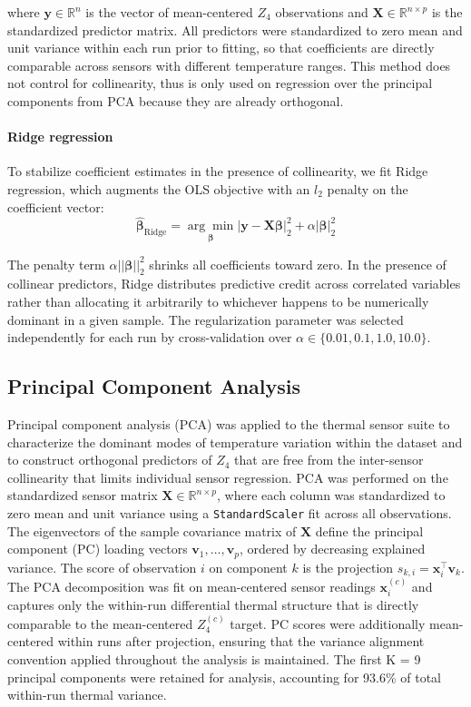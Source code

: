 \documentclass[SE,authoryear,toc]{lsstdoc}
\begin{document}
where $\mathbf{y} \in \mathbb{R}^n$ is the vector of mean-centered $Z_4$ observations and $\mathbf{X} \in \mathbb{R}^{n \times p}$ is the standardized predictor matrix. All predictors were standardized to zero mean and unit variance within each run prior to fitting, so that coefficients are directly comparable across sensors with different temperature ranges. This method does not control for collinearity, thus is only used on regression over the principal components from PCA because they are already orthogonal.


\paragraph{Ridge regression}
To stabilize coefficient estimates in the presence of collinearity, we fit Ridge regression, which augments the OLS objective with an $l_2$ penalty on the coefficient vector:
\begin{equation}
\hat{\boldsymbol{\beta}}_\text{Ridge} = \underset{\boldsymbol{\beta}}{\arg\min} \left| \mathbf{y} - \mathbf{X}\boldsymbol{\beta} \right|_2^2 + \alpha \left| \boldsymbol{\beta} \right|_2^2
\end{equation}

The penalty term $\alpha ||\boldsymbol{\beta}||^2_2$ shrinks all coefficients toward zero. In the presence of collinear predictors, Ridge distributes predictive credit across correlated variables rather than allocating it arbitrarily to whichever happens to be numerically dominant in a given sample. The regularization parameter was selected independently for each run by cross-validation over $\alpha \in \{0.01, 0.1, 1.0, 10.0\}$.

\subsection{Principal Component Analysis}
\label{subsec: PCA}

Principal component analysis (PCA) was applied to the thermal sensor suite to characterize the dominant modes of temperature variation within the dataset and to construct orthogonal predictors of $Z_4$ that are free from the inter-sensor collinearity that limits individual sensor regression.
PCA was performed on the standardized sensor matrix $\mathbf{X} \in \mathbb{R}^{n \times p}$, where each column was standardized to zero mean and unit variance using a \texttt{StandardScaler} fit across all observations. The eigenvectors of the sample covariance matrix of $\mathbf{X}$ define the principal component (PC) loading vectors $\mathbf{v}_1, \ldots, \mathbf{v}_p$, ordered by decreasing explained variance. The score of observation $i$ on component $k$ is the projection $s_{k,i} = \mathbf{x}_i^\top \mathbf{v}_k$.
The PCA decomposition was fit on mean-centered sensor readings $\mathbf{x}_i^{(c)}$ and captures only the within-run differential thermal structure that is directly comparable to the mean-centered $Z_4^{(c)}$ target.
PC scores were additionally mean-centered within runs after projection, ensuring that the variance alignment convention applied throughout the analysis is maintained. The first K = 9 principal components were retained for analysis, accounting for 93.6\% of total within-run thermal variance.
\end{document}
